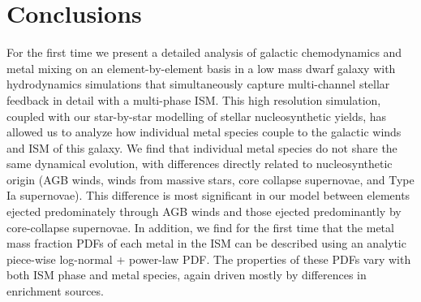 \documentclass[twocolumn]{aastex61}
\begin{document}

\section{Conclusions}
\label{sec:conclusions}
For the first time we present a detailed analysis of galactic chemodynamics and metal mixing on an element-by-element basis in a low mass dwarf galaxy with hydrodynamics simulations that simultaneously capture multi-channel stellar feedback in detail with a multi-phase ISM. This high resolution simulation, coupled with our star-by-star modelling of stellar nucleosynthetic yields, has allowed us to analyze how individual metal species couple to the galactic winds and ISM of this galaxy. We find that individual metal species do not share the same dynamical evolution, with differences directly related to nucleosynthetic origin (AGB winds, winds from massive stars, core collapse supernovae, and Type Ia supernovae). This difference is most significant in our model between elements ejected predominately through AGB winds and those ejected predominantly by core-collapse supernovae. In addition, we find for the first time that the metal mass fraction PDFs of each metal in the ISM can be described using an analytic piece-wise log-normal + power-law PDF. The properties of these PDFs vary with both ISM phase and metal species, again driven mostly by differences in enrichment sources.
\end{document}
